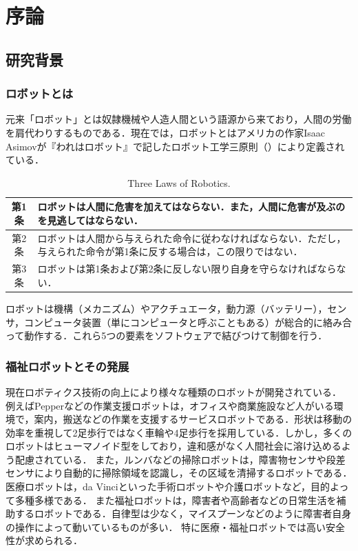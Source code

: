 \chapter{序論}
\label{chap_intro}
\newpage

\section{研究背景}
\subsection{ロボットとは}
元来「ロボット」とは奴隷機械や人造人間という語源から来ており，人間の労働を肩代わりするものである．現在では，ロボットとはアメリカの作家Isaac Asimovが『われはロボット』\cite{われはロボット}で記したロボット工学三原則（）により定義されている．
\begin{table}[H]
    \centering
    \caption[Three Laws of Robotics. ]{Three Laws of Robotics\cite{われはロボット}.}
    \begin{tabular}{cp{0.8\hsize}}\toprule
        第1条 & ロボットは人間に危害を加えてはならない．また，人間に危害が及ぶのを見逃してはならない． \\ \hline
        第2条 & ロボットは人間から与えられた命令に従わなければならない．ただし，与えられた命令が第1条に反する場合は，この限りではない． \\ \hline
        第3条 & ロボットは第1条および第2条に反しない限り自身を守らなければならない． \\ \bottomrule
    \end{tabular}
    \label{tab:ロボット三原則}
\end{table}

ロボットは機構（メカニズム）やアクチュエータ，動力源（バッテリー），センサ，コンピュータ装置（単にコンピュータと呼ぶこともある）が総合的に絡み合って動作する．これら5つの要素をソフトウェアで結びつけて制御を行う．


\subsection{福祉ロボットとその発展}
現在ロボティクス技術の向上により様々な種類のロボットが開発されている．
例えばPepper\cite{pepper}などの作業支援ロボットは，オフィスや商業施設など人がいる環境で，案内，搬送などの作業を支援するサービスロボットである．形状は移動の効率を重視して2足歩行ではなく車輪や4足歩行を採用している．しかし，多くのロボットはヒューマノイド型をしており，違和感がなく人間社会に溶け込めるよう配慮されている．
また，ルンバ\cite{ルンバ}などの掃除ロボットは，障害物センサや段差センサにより自動的に掃除領域を認識し，その区域を清掃するロボットである．
医療ロボットは，da Vinci\cite{ダビンチ}といった手術ロボットや介護ロボットなど，目的よって多種多様である．
また福祉ロボットは，障害者や高齢者などの日常生活を補助するロボットである．自律型は少なく，マイスプーン\cite{マイスプーン}などのように障害者自身の操作によって動いているものが多い．%
特に医療・福祉ロボットでは高い安全性が求められる．

